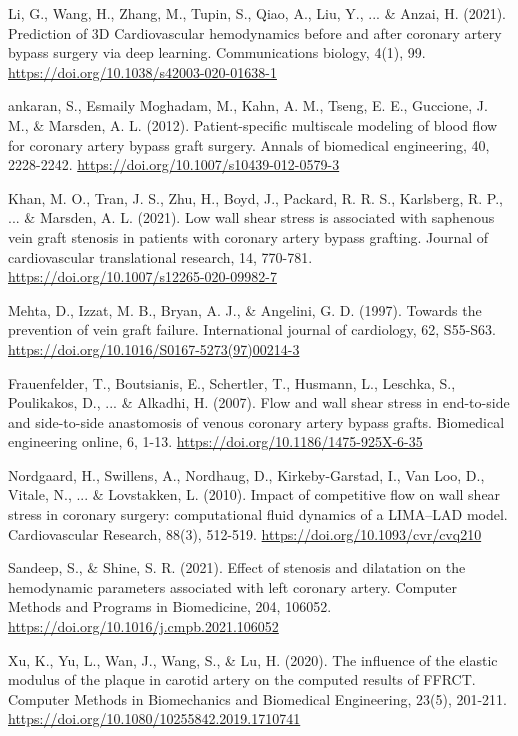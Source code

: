 ﻿\documentclass[12pt,a4paper]{article}
\theoremstyle{definition}
\numberwithin{equation}{section}
\begin{document}
\begin{thebibliography}{}
 Li, G., Wang, H., Zhang, M., Tupin, S., Qiao, A., Liu, Y., ... \& Anzai, H. (2021). Prediction of 3D Cardiovascular hemodynamics before and after coronary artery bypass surgery via deep learning. Communications biology, 4(1), 99. \url{https://doi.org/10.1038/s42003-020-01638-1}

 ankaran, S., Esmaily Moghadam, M., Kahn, A. M., Tseng, E. E., Guccione, J. M., \& Marsden, A. L. (2012). Patient-specific multiscale modeling of blood flow for coronary artery bypass graft surgery. Annals of biomedical engineering, 40, 2228-2242. \url{https://doi.org/10.1007/s10439-012-0579-3} 

 Khan, M. O., Tran, J. S., Zhu, H., Boyd, J., Packard, R. R. S., Karlsberg, R. P., ... \& Marsden, A. L. (2021). Low wall shear stress is associated with saphenous vein graft stenosis in patients with coronary artery bypass grafting. Journal of cardiovascular translational research, 14, 770-781. \url{https://doi.org/10.1007/s12265-020-09982-7}

 Mehta, D., Izzat, M. B., Bryan, A. J., \& Angelini, G. D. (1997). Towards the prevention of vein graft failure. International journal of cardiology, 62, S55-S63.
\url{https://doi.org/10.1016/S0167-5273(97)00214-3}

 Frauenfelder, T., Boutsianis, E., Schertler, T., Husmann, L., Leschka, S., Poulikakos, D., ... \& Alkadhi, H. (2007). Flow and wall shear stress in end-to-side and side-to-side anastomosis of venous coronary artery bypass grafts. Biomedical engineering online, 6, 1-13. \url{https://doi.org/10.1186/1475-925X-6-35} 

 Nordgaard, H., Swillens, A., Nordhaug, D., Kirkeby-Garstad, I., Van Loo, D., Vitale, N., ... \& Lovstakken, L. (2010). Impact of competitive flow on wall shear stress in coronary surgery: computational fluid dynamics of a LIMA–LAD model. Cardiovascular Research, 88(3), 512-519. \url{https://doi.org/10.1093/cvr/cvq210}

 Sandeep, S., \& Shine, S. R. (2021). Effect of stenosis and dilatation on the hemodynamic parameters associated with left coronary artery. Computer Methods and Programs in Biomedicine, 204, 106052. \url{https://doi.org/10.1016/j.cmpb.2021.106052}

 Xu, K., Yu, L., Wan, J., Wang, S., \& Lu, H. (2020). The influence of the elastic modulus of the plaque in carotid artery on the computed results of FFRCT. Computer Methods in Biomechanics and Biomedical Engineering, 23(5), 201-211. \url{https://doi.org/10.1080/10255842.2019.1710741}


\end{thebibliography}
\end{document}
